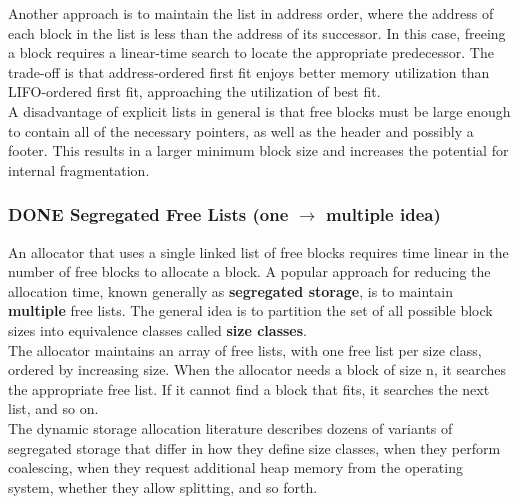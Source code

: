 \documentclass[11pt]{article}
\begin{document}
Another approach is to maintain the list in address order, where the address of each block in the list is less than the address of its successor. In this case, freeing a block requires a linear-time search to locate the appropriate predecessor. The trade-off is that address-ordered first fit enjoys better memory utilization than LIFO-ordered first fit, approaching the utilization of best fit.\\

A disadvantage of explicit lists in general is that free blocks must be large enough to contain all of the necessary pointers, as well as the header and possibly a footer. This results in a larger minimum block size and increases the potential for internal fragmentation.\\


\subsubsection{{\bfseries\sffamily DONE} Segregated Free Lists (one \(\rightarrow\) multiple idea)}
\label{sec:org94f041f}
An allocator that uses a single linked list of free blocks requires time linear in the number of free blocks to allocate a block. A popular approach for reducing the allocation time, known generally as \textbf{segregated storage}, is to maintain \textbf{multiple} free lists. The general idea is to partition the set of all possible block sizes into equivalence classes called \textbf{size classes}.\\

The allocator maintains an array of free lists, with one free list per size class, ordered by increasing size. When the allocator needs a block of size n, it searches the appropriate free list. If it cannot find a block that fits, it searches the next list, and so on.\\

The dynamic storage allocation literature describes dozens of variants of segregated storage that differ in how they define size classes, when they perform coalescing, when they request additional heap memory from the operating system, whether they allow splitting, and so forth.\\
\end{document}
